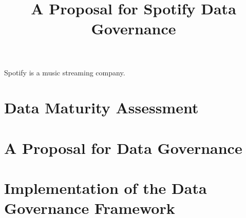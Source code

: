 \documentclass[11pt,a4paper,computermodern]{article}
\title{A Proposal for Spotify Data Governance}
\date{}
\begin{document}
\maketitle

\vspace{-10mm}

Spotify is a music streaming company.


\section*{Data Maturity Assessment}



\section*{A Proposal for Data Governance}



\section*{Implementation of the Data Governance Framework}
\end{document}
